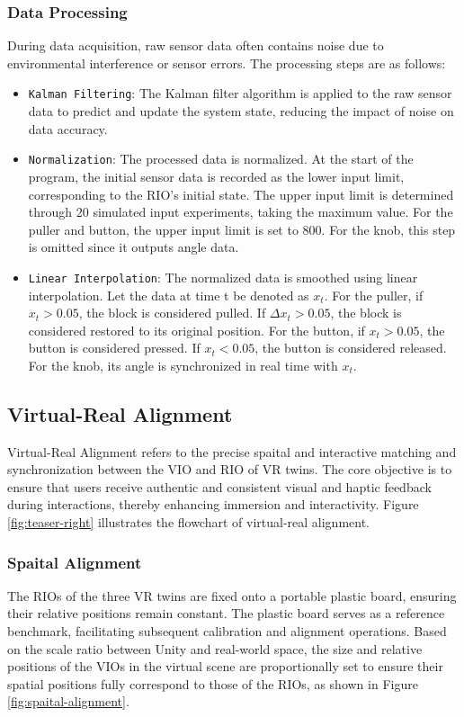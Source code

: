 \documentclass[sigconf,review,anonymous]{acmart}
\begin{document}
\subsubsection{Data Processing}
During data acquisition, raw sensor data often contains noise due to environmental interference or sensor errors. The processing steps are as follows:

\begin{itemize}
  \item {\texttt{Kalman Filtering}}: The Kalman filter algorithm is applied to the raw sensor data to predict and update the system state, reducing the impact of noise on data accuracy.

  \item {\texttt{Normalization}}: The processed data is normalized. At the start of the program, the initial sensor data is recorded as the lower input limit, corresponding to the RIO's initial state. The upper input limit is determined through 20 simulated input experiments, taking the maximum value. For the puller and button, the upper input limit is set to 800. For the knob, this step is omitted since it outputs angle data.

  \item {\texttt{Linear Interpolation}}: The normalized data is smoothed using linear interpolation. Let the data at time t be denoted as $x_{t}$. For the puller, if $x_{t}  > 0.05$, the block is considered pulled. If $\Delta x_{t} > 0.05$, the block is considered restored to its original position. For the button, if $x_{t}  > 0.05$, the button is considered pressed. If $x_{t} < 0.05$, the button is considered released. For the knob, its angle is synchronized in real time with $x_{t}$.
\end{itemize}

\subsection{Virtual-Real Alignment}
Virtual-Real Alignment refers to the precise spaital and interactive matching and synchronization between the VIO and RIO of VR twins. The core objective is to ensure that users receive authentic and consistent visual and haptic feedback during interactions, thereby enhancing immersion and interactivity. Figure \ref{fig:teaser-right} illustrates the flowchart of virtual-real alignment.

\subsubsection{Spaital Alignment}
The RIOs of the three VR twins are fixed onto a portable plastic board, ensuring their relative positions remain constant. The plastic board serves as a reference benchmark, facilitating subsequent calibration and alignment operations. Based on the scale ratio between Unity and real-world space, the size and relative positions of the VIOs in the virtual scene are proportionally set to ensure their spatial positions fully correspond to those of the RIOs, as shown in Figure \ref{fig:spaital-alignment}.
\end{document}
